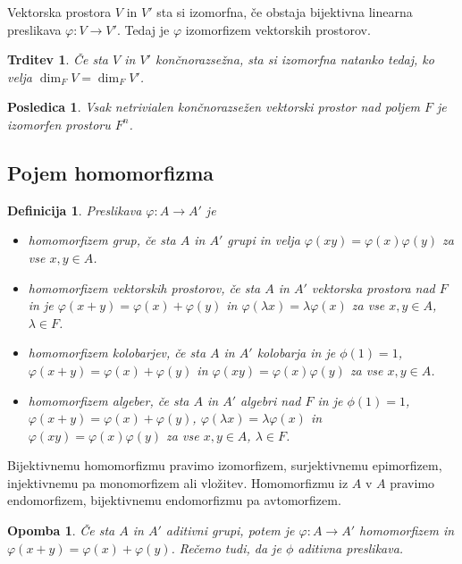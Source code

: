\documentclass[10pt, a4paper]{article}
\newtheorem{posledica}[izr]{Posledica}
\newtheorem{trditev}[izr]{Trditev}
\newtheorem{defi}{Definicija}[section]
\newenvironment{noticeB}{%
  \tcolorbox[%
  notitle,
  empty,
  enhanced,  %
  breakable,
  coltext=black,
  colback=white, 
  fontupper=\rmfamily,
  parbox=false,
  noparskip,
  sharp corners,
  boxrule=-1pt,  %
  frame hidden,
  left=7pt,  %
  right=7pt,
  top=5pt,
  bottom=5pt,
  before skip=2.5ex plus 2pt,
  after skip=2.5ex plus 2pt,
  borderline west = {1.5pt}{-0.1pt}{blue!30!black}, %
  overlay unbroken and last={%
    \draw[color=black, line width=1.25pt]
    ($(frame.south west)+(1.pt, -0.1pt)$) -- ++(2em, 0);
  }
  ]}
{\endtcolorbox}
\newenvironment{definicija}{\begin{defi}\begin{noticeB}}{%
    \end{noticeB}\end{defi}}
\newtheorem*{opomba}{Opomba}
\begin{document}
Vektorska prostora $V$ in $V'$ sta si izomorfna, če obstaja bijektivna linearna preslikava
$\varphi: V \to V'$. Tedaj je $\varphi$ izomorfizem vektorskih prostorov.

\begin{trditev}
  Če sta $V$ in $V'$ končnorazsežna, sta si izomorfna natanko tedaj, ko velja $\dim_F V = \dim_F V'$.
\end{trditev}

\begin{posledica}
  Vsak netrivialen končnorazsežen vektorski prostor nad poljem $F$ je izomorfen prostoru $F^n$.
\end{posledica}

\subsection{Pojem homomorfizma}

\begin{definicija}
  Preslikava $\varphi: A \to A'$ je 
  \begin{itemize}
    \item homomorfizem grup, če sta $A$ in $A'$ grupi in velja $\varphi(xy) = \varphi(x) \varphi(y)$ za vse $x, y \in A$.
    \item homomorfizem vektorskih prostorov, če sta $A$ in $A'$ vektorska prostora nad $F$ in je $\varphi (x + y) = \varphi(x) + \varphi(y)$ 
    in $\varphi(\lambda x) = \lambda \varphi(x)$ za vse $x,y \in A$, $\lambda \in F$.
    \item homomorfizem kolobarjev, če sta $A$ in $A'$ kolobarja in je $\phi(1) = 1$, $\varphi (x + y) = \varphi(x) + \varphi(y)$ 
    in $\varphi(xy) = \varphi(x) \varphi(y)$ za vse $x,y \in A$.
    \item homomorfizem algeber, če sta $A$ in $A'$ algebri nad $F$ in je $\phi(1) = 1$, $\varphi (x + y) = \varphi(x) + \varphi(y)$, $\varphi(\lambda x) = \lambda \varphi(x)$ 
    in $\varphi(xy) = \varphi(x) \varphi(y)$ za vse $x,y \in A$, $\lambda \in F$.
  \end{itemize}
\end{definicija}

Bijektivnemu homomorfizmu pravimo izomorfizem, surjektivnemu epimorfizem, 
injektivnemu pa monomorfizem ali vložitev.
Homomorfizmu iz $A$ v $A$ pravimo endomorfizem, bijektivnemu endomorfizmu pa avtomorfizem.

\begin{opomba}
  Če sta $A$ in $A'$ aditivni grupi, potem je $\varphi: A \to A'$ homomorfizem in $\varphi(x + y) = \varphi(x) + \varphi(y)$.
  Rečemo tudi, da je $\phi$ aditivna preslikava.
\end{opomba}
\end{document}
